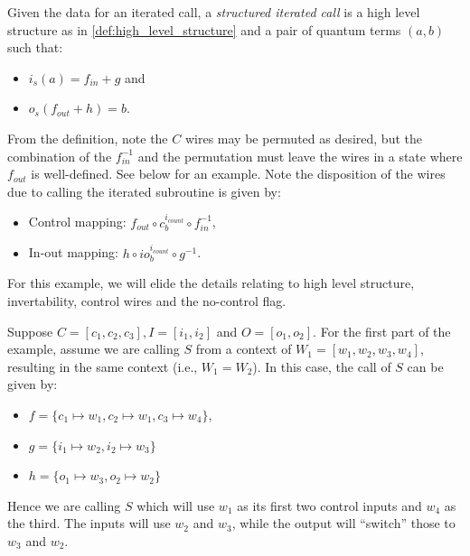 \begin{definition}\label{def:structured_iterated_call}
  Given the data for an iterated call,
  a \emph{structured iterated call} is a high level structure as in
  \vref{def:high_level_structure} and a pair of quantum
  terms $(a,b)$ such that:
  \begin{itemize}
    \item $i_s(a) = f_{in}+g$ and
    \item $o_s(f_{out}+h) = b$.
  \end{itemize}

\end{definition}

From the definition, note the $C$ wires may be permuted as
desired, but the combination of the $f_{in}^{-1}$ and
the permutation must leave the wires in a state where $f_{out}$
is well-defined. See below for an example.
Note the disposition of the wires due to calling the iterated
subroutine is given by:
\begin{itemize}
  \item Control mapping: $f_{out} \circ c_b^{i_{count}}\circ f_{in}^{-1}$,
  \item In-out mapping: $h \circ io_b^{i_{count}} \circ g^{-1}$.
\end{itemize}


\begin{example}
\end{example}
  For this example, we will elide the details relating to high level
  structure, invertability, control wires and the no-control flag.

  Suppose $C=[c_1,c_2,c_3], I=[i_1,i_2]$ and $O=[o_1,o_2]$.
  For the first part of the example, assume we are calling $S$
  from a context of $W_1=[w_1,w_2,w_3,w_4]$, resulting in the
  same context (i.e., $W_1 = W_2$).
  In this case, the call of $S$ can be given by:
  \begin{itemize}
    \item $f = \{c_1\mapsto w_1, c_2 \mapsto w_1, c_3 \mapsto w_4\}$,
    \item $g = \{i_1 \mapsto w_2, i_2 \mapsto w_3\}$
    \item $h = \{o_1 \mapsto w_3, o_2 \mapsto w_2\}$
  \end{itemize}
  Hence we are calling $S$ which will use $w_1$ as its
  first two control inputs and $w_4$ as the third. The
  inputs will use $w_2$ and $w_3$, while the output will
  ``switch'' those to $w_3$ and $w_2$.

